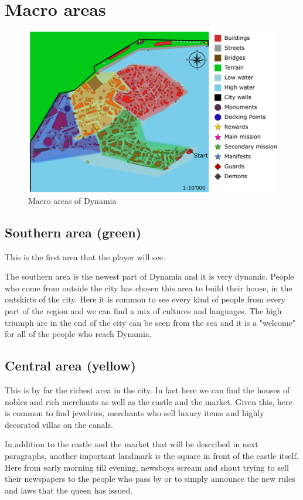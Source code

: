 \section{Macro areas}

\begin{figure}[H]
  \centering
  \includegraphics[width=\textwidth]{Images/Maps/dynamiaAreas}
  \caption{Macro areas of Dynamia}
\end{figure}

\subsection{Southern area (green)}
This is the first area that the player will see.

The southern area is the newest part of Dynamia and it is very dynamic. People who come from outside the city has chosen this area to build their house, in the outskirts of the city. Here it is common to see every kind of people from every part of the region and we can find a mix of cultures and languages. The high triumph arc in the end of the city can be seen from the sea and it is a "welcome" for all of the people who reach Dynamia.

\subsection{Central area (yellow)}
This is by far the richest area in the city. In fact here we can find the houses of  nobles and rich merchants as well as the castle and the market. Given this, here is common to find jewelries, merchants who sell luxury items and highly decorated villas on the canals.

In addition to the castle and the market that will be described in next paragraphs, another important landmark is the square in front of the castle itself. Here from early morning till evening, newsboys scream and shout trying to sell their newspapers to the people who pass by or to simply announce the new rules and laws that the queen has issued.

